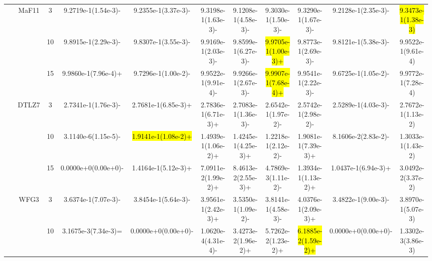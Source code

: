 \documentclass[a4paper,fleqn]{cas-dc}
\newcommand{\highlight}[1]{
	\begingroup
	\sethlcolor{Seashell}%
	\hl{#1}%
	\endgroup
}
\begin{document}
\begin{sloppypar}
\begin{table}[ht]
{\begin{tabular}{ccccccccccc}
					
					
					
					\multirow{12}{*}{~}&\multirow{3}{*}{MaF11} &3 	&9.2719e-1(1.54e-3)-		&9.2355e-1(3.37e-3)-	&9.3198e-1(1.63e-3)-	&9.1208e-1(4.58e-3)-	&9.3030e-1(1.50e-3)-	&9.3290e-1(1.67e-3)-	&9.2128e-1(2.35e-3)-	&\highlight{9.3473e-1(1.38e-3)}\\ 
					
					\multirow{12}{*}{~}&\multirow{3}{*}{~} &10 	&9.8915e-1(2.29e-3)-		&9.8307e-1(3.55e-3)-	&9.9169e-1(2.03e-3)-	&9.8599e-1(6.27e-3)-	&\highlight{9.9705e-1(1.00e-3)+}	&9.8773e-1(2.69e-3)-	&9.8121e-1(5.38e-3)-	&9.9522e-1(9.61e-4)\\
					
					\multirow{12}{*}{~}&\multirow{3}{*}{~} &15 &9.9860e-1(7.96e-4)+		&9.7296e-1(1.00e-2)-	&9.9522e-1(9.91e-4)-	&9.9266e-1(2.67e-3)-	&\highlight{9.9907e-1(7.68e-4)+}	&9.9541e-1(2.22e-3)-	&9.6725e-1(1.05e-2)-	&9.9772e-1(7.28e-4)\\
					
					
					
					
					
					\multirow{12}{*}{~}&\multirow{3}{*}{DTLZ7} &3 &2.7341e-1(1.76e-3)-		&2.7681e-1(6.85e-3)+	&2.7836e-1(6.71e-3)+	&2.7083e-1(1.36e-3)-	&2.6542e-1(1.97e-2)-	&2.5742e-1(2.98e-2)-	&2.5289e-1(4.03e-3)-	&2.7672e-1(1.13e-2)\\ 
					
					\multirow{12}{*}{~}&\multirow{3}{*}{~} &10 &3.1140e-6(1.15e-5)-		&\highlight{1.9141e-1(1.08e-2)+}	&1.4939e-1(1.06e-2)+	&1.4245e-1(4.25e-3)+	&1.2218e-1(2.12e-2)-	&1.9081e-1(7.39e-3)+	&8.1606e-2(2.83e-2)-	&1.3033e-1(1.43e-2)\\
					
					\multirow{12}{*}{~}&\multirow{3}{*}{~} &15 	&0.0000e+0(0.00e+0)-		&1.4164e-1(5.12e-3)+	&7.0911e-2(1.99e-2)+	&8.4613e-2(2.55e-3)+	&4.7869e-3(1.11e-2)-	&1.3934e-1(1.13e-2)+	&1.0437e-1(6.94e-3)+	&3.0492e-2(3.37e-2)\\
					
					
					
					
					
					
					
					
					
					
					\midrule[0.35pt]
					\multirow{9}{*}{Degenerated}&\multirow{3}{*}{WFG3}&3 	&3.6374e-1(7.07e-3)-		&3.8454e-1(5.64e-3)-	&3.9561e-1(2.42e-3)+	&3.5350e-1(1.09e-2)-	&3.8141e-1(4.58e-3)-	&4.0376e-1(2.09e-3)+	&3.4822e-1(9.00e-3)-	&3.8970e-1(5.07e-3)\\ 
					
					\multirow{9}{*}{~}&\multirow{3}{*}{~} &10 		&3.1675e-3(7.34e-3)=		&0.0000e+0(0.00e+0)-	&1.0620e-4(4.31e-4)-	&3.4273e-2(1.96e-2)+	&5.7262e-2(1.23e-2)+	&\highlight{6.1885e-2(1.59e-2)+}	&0.0000e+0(0.00e+0)-	&1.3302e-3(3.86e-3)\\
					

\end{tabular}}
\end{table}
\end{sloppypar}
\end{document}
